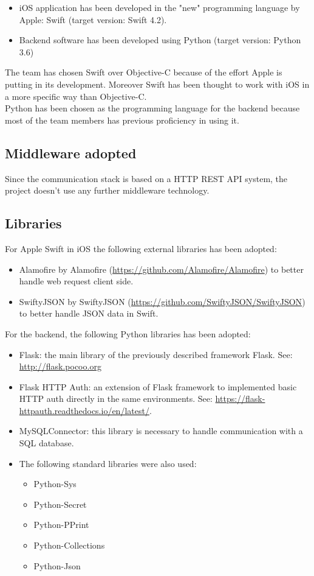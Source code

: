 \documentclass{article}
\begin{document}
\begin{itemize}
	\item iOS application has been developed in the "new" programming language by Apple: Swift (target version: Swift 4.2).
	\item  Backend software has been developed using Python (target version: Python 3.6)
\end{itemize}

The team has chosen Swift over Objective-C because of the effort Apple is putting in its development. Moreover Swift has been thought to work with iOS in a more specific way than Objective-C.\\
Python has been chosen as the programming language for the backend because most of the team members has previous proficiency in using it.

\subsection{Middleware adopted}
Since the communication stack is based on a HTTP REST API system, the project doesn't use any further middleware technology.

\subsection{Libraries}
For Apple Swift in iOS the following external libraries has been adopted:
\begin{itemize}
	\item Alamofire by Alamofire (\url{https://github.com/Alamofire/Alamofire}) to better handle web request client side.
	\item SwiftyJSON by SwiftyJSON (\url{https://github.com/SwiftyJSON/SwiftyJSON}) to better handle JSON data in Swift.
\end{itemize}

For the backend, the following Python libraries has been adopted:
\begin{itemize}
	\item Flask: the main library of the previously described framework Flask. See: \url{http://flask.pocoo.org}
	\item Flask HTTP Auth: an extension of Flask framework to implemented basic HTTP auth directly in the same environments. See: \url{https://flask-httpauth.readthedocs.io/en/latest/}.
	\item MySQLConnector: this library is necessary to handle communication with a SQL database.
	\item The following standard libraries were also used:
			\begin{itemize}
				\item Python-Sys
				\item Python-Secret
				\item Python-PPrint
				\item Python-Collections
				\item Python-Json
			\end{itemize}
\end{itemize}
\end{document}
